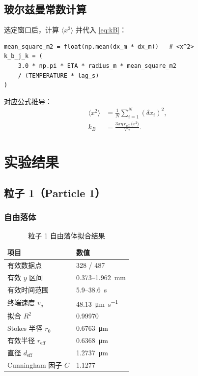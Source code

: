 \documentclass[12pt,a4paper]{ctexart}
\begin{document}
\subsection{玻尔兹曼常数计算}

选定窗口后，计算 $\langle x^2\rangle$ 并代入 \eqref{eq:kB}：

\begin{lstlisting}[style=python, caption={$k_B$ 计算（\texttt{select\_single\_lag\_window} 节选）}]
mean_square_m2 = float(np.mean(dx_m * dx_m))   # <x^2>
k_b_j_k = (
    3.0 * np.pi * ETA * radius_m * mean_square_m2
    / (TEMPERATURE * lag_s)
)
\end{lstlisting}

对应公式推导：
\begin{align}
  \langle x^2 \rangle &= \frac{1}{N}\sum_{i=1}^N (\delta x_i)^2, \\
  k_B &= \frac{3\pi\eta\,r_\text{eff}\,\langle x^2\rangle}{T\,\tau}.
\end{align}

\section{实验结果}

\subsection{粒子 1（Particle 1）}

\subsubsection{自由落体}

\begin{table}[h]
\centering
\caption{粒子 1 自由落体拟合结果}
\label{tab:p1_freefall}
\begin{tabular}{ll}
\toprule
项目 & 数值 \\
\midrule
有效数据点 & 328 / 487 \\
有效 $y$ 区间 & 0.373--\SI{1.962}{\milli\metre} \\
有效时间范围 & 5.9--\SI{38.6}{\second} \\
终端速度 $v_g$ & \SI{48.13}{\micro\metre\per\second} \\
拟合 $R^2$ & 0.99970 \\
Stokes 半径 $r_0$ & \SI{0.6763}{\micro\metre} \\
有效半径 $r_\text{eff}$ & \SI{0.6368}{\micro\metre} \\
直径 $d_\text{eff}$ & \SI{1.2737}{\micro\metre} \\
Cunningham 因子 $C$ & 1.1277 \\
\bottomrule
\end{tabular}
\end{table}
\end{document}

